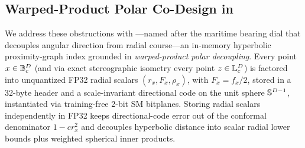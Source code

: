 \subsection{Warped-Product Polar Co-Design in \rquiver{}}
\label{subsec:intro_solution}

We address these obstructions with \textbf{\rquiver{}}---named after the maritime bearing dial that decouples angular direction from radial course---an in-memory hyperbolic proximity-graph index grounded in \emph{warped-product polar decoupling}.
Every point $x \in \mathbb{B}_c^D$ (and via exact stereographic isometry every point $z \in \mathbb{L}_c^D$) is factored into unquantized FP32 radial scalars $(r_x,F_x,\rho_x)$, with $F_x=f_x/2$, stored in a 32-byte header and a scale-invariant directional code on the unit sphere $\mathbb{S}^{D-1}$, instantiated via training-free 2-bit {SM} bitplanes.
Storing radial scalars independently in FP32 keeps directional-code error out of the conformal denominator $1-cr_x^2$ and decouples hyperbolic distance into scalar radial lower bounds plus weighted spherical inner products.

